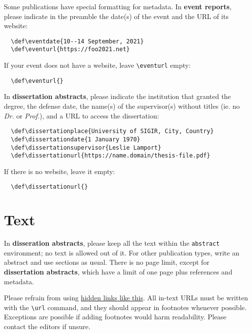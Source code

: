 \documentclass[news]{sigirforum}
\begin{document}
Some publications have special formatting for metadata. In \textbf{event reports}, please indicate in the preamble the date(s) of the event and the URL of its website:
\begin{verbatim}
  \def\eventdate{10--14 September, 2021}
  \def\eventurl{https://foo2021.net}
\end{verbatim}
If your event does not have a website, leave \texttt{\textbackslash eventurl} empty:
\begin{verbatim}
  \def\eventurl{}
\end{verbatim}

In \textbf{dissertation abstracts}, please indicate the institution that granted the degree, the defense date, the name(s) of the supervisor(s) without titles (ie. no \textsl{Dr.} or \textsl{Prof.}), and a URL to access the dissertation:
\begin{verbatim}
  \def\dissertationplace{University of SIGIR, City, Country}
  \def\dissertationdate{1 January 1970}
  \def\dissertationsupervisor{Leslie Lamport}
  \def\dissertationurl{https://name.domain/thesis-file.pdf}
\end{verbatim}
If there is no website, leave it empty:
\begin{verbatim}
  \def\dissertationurl{}
\end{verbatim}

\section{Text}

In \textbf{disseration abstracts}, please keep all the text within the \texttt{abstract} environment; no text is allowed out of it. For other publication types, write an abstract and use sections as usual. There is no page limit, except for \textbf{dissertation abstracts}, which have a limit of one page plus references and metadata.

Please refrain from using \href{https://sigir.org}{hidden links like this}. All in-text URLs must be written with the \texttt{\textbackslash url} command, and they should appear in footnotes whenever possible. Exceptions are possible if adding footnotes would harm readability. Please contact the editors if unsure.
\end{document}
